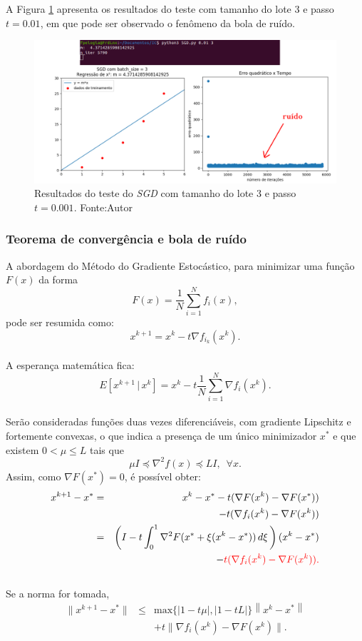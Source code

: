\documentclass[a4paper,12pt]{article}
\begin{document}
A Figura \ref{fig:ruido} apresenta os resultados do teste com tamanho do lote 3 e passo $t = 0.01 $, em que pode ser observado o fenômeno da bola de ruído.   

\begin{figure}[H]
\centering 
\includegraphics[scale=0.5]{Figuras/bola_ruido.png}
\caption{Resultados do teste do \textit{SGD} com tamanho do lote 3 e passo $t = 0.001$. Fonte:Autor }
\label{fig:ruido}
\end{figure} 

\subsubsection{Teorema de convergência e bola de ruído}

A abordagem do Método do Gradiente Estocástico, para minimizar uma função $F(x)$ da forma $$F(x) = \frac{1}{N} \sum_{i=1}^{N}f_i(x),$$ pode ser resumida como:
	$$x^{k+1} = x^k - t \nabla f_{i_k}(x^k).$$\\
A esperança matemática fica: $$E[x^{k+1} \, | \, x^k]   = x^k - t \frac{1}{N} \sum_{i=1}^{N} \nabla f_i(x^k).$$\\


Serão consideradas funções duas vezes diferenciáveis, com gradiente Lipschitz e fortemente convexas, o que indica a presença de um único minimizador $x^*$  e que existem $0< \mu \leq L$ tais que  
$$\mu I \preceq \nabla^2 f(x) \preceq L I, \,\,\, \forall x. $$
Assim, como $\nabla F(x^*)=0$, é possível obter: 
\begin{eqnarray*}
x^{k+1} - x^* & =& x^k - x^* - t (\nabla F(x^k) - \nabla F(x^*)) \\ && - t (\nabla f_i(x^k) - \nabla F(x^k)) \\
&=& \left(I - t \int_{0}^1 \nabla^2 F(x^*+\xi(x^k-x^*))\, d \xi \,\right)(x^k - x^*)\\&& - {\color{red} t (\nabla f_i(x^k) - \nabla F(x^k)).}
\end{eqnarray*}\\
Se a norma for tomada,
\begin{eqnarray*}
\|x^{k+1} - x^*\|&\leq& \text{max}\{\left | 1 -  t \mu\right |, \left | 1 - t L \right |\} \left \|x^k - x^*\right \|\\
&&+t \|\nabla f_i(x^k) - \nabla F(x^k)\|.
\end{eqnarray*}	\\
\end{document}
